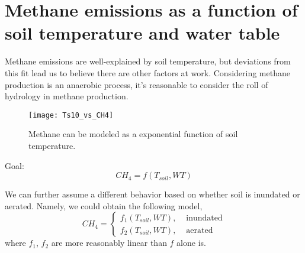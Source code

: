 \documentclass[12 pt]{article}
\begin{document}
\section{Methane emissions as a function of soil temperature and water table}
Methane emissions are well-explained by soil temperature, but deviations from this fit lead us to believe there are other factors at work. Considering methane production is an anaerobic process, it's reasonable to consider the roll of hydrology in methane production. 
\begin{figure}[!htb]
\centering
\texttt{[image: Ts10\_vs\_CH4]}
\caption{Methane can be modeled as a exponential function of soil temperature. }
\end{figure}

Goal:
\[CH_4 = f(T_{soil},WT) \]

We can further assume a different behavior based on whether soil is inundated or aerated. Namely, we could obtain the following model,
 \[
        CH_4=
\begin{cases}
f_1(T_{soil},WT), & \text{ inundated} \\
f_2(T_{soil},WT), & \text{ aerated} 
\end{cases}
  \]
where $f_1$, $f_2$ are more reasonably linear than $f$ alone is. 
        


\begin{comment}
\begin{figure}
\centering
\begin{tikzpicture}[
rno/.style={circle, draw=black!80, fill=green!0,  thick, minimum size=10mm},
rnoin/.style={circle, draw=black!60,   thick, minimum size=10mm},
    pil/.style={
           ->,
           thick,
           shorten <=2pt,
           shorten >=2pt,}
]
\draw[thick, <-] (-.7,.1) arc (20:320:.45);
\draw[thick, ->] (4.05,-.29) arc (220:520:.45);
\node[rno] (main1) {1};
\node (branch11) [left= of main1] {1/9};
\node (dum1) [right=of main1] {};
\node[rno] (main0) [right= of dum1] {0}
edge[pil, bend right=42] (main1.north);
\node (branch01) [above=of dum1] {2/3};
\node (branch00) [right= of main0] {1/3};
\end{tikzpicture}
\caption{A three-state chain without efficient coupling.} \label{F1}
\end{figure}
\end{comment}
\end{document}

